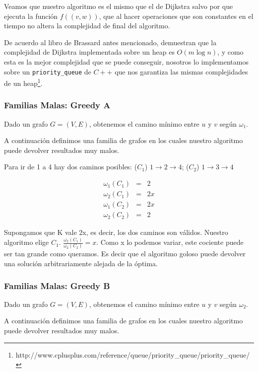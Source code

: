 Veamos que nuestro algoritmo es el mismo que el de Dijkstra salvo por que ejecuta la funci\'on $f((v,w))$, que al hacer operaciones que son constantes en el tiempo no altera la complejidad de final del algoritmo. 

De acuerdo al libro de Brassard antes mencionado, demuestran que la complejidad de Dijkstra implementada sobre un heap es $O(m \log n)$, y como esta es la mejor complejidad que se puede conseguir, nosotros lo implementamos sobre un \texttt{priority\_queue} de $C++$ que nos garantiza las mismas complejidades de un heap\footnote{http://www.cplusplus.com/reference/queue/priority\_queue/priority\_queue/}. 

\clearpage
\subsubsection{Familias Malas: Greedy A}\label{subsubsec:greedy-a}
Dado un grafo $G = (V,E)$, obtenemos el camino m\'inimo entre $u$ y $v$ seg\'un $\omega_1$. 

A continuación definimos una familia de grafos en los cuales nuestro algoritmo puede devolver resultados muy malos.

Para ir de 1 a 4 hay dos caminos posibles: ($C_1$) $1 \rightarrow 2 \rightarrow 4$; ($C_2$) $1 \rightarrow 3 \rightarrow 4$

\begin{eqnarray}
 \omega_1(C_1) &=& 2 	\\ 
 \omega_2(C_1) &=& 2x	\\
 \omega_1(C_2) &=& 2x	\\
 \omega_2(C_2) &=& 2
\end{eqnarray}

Supongamos que K vale 2x, es decir, los dos caminos son válidos. Nuestro algoritmo elige $C_1$.
$\frac{\omega_2(C_1)}{\omega_2(C_2)} = x$.
Como x lo podemos variar, este cociente puede ser tan grande como queramos. Es decir que el algoritmo goloso puede devolver una solución
arbitrariamente alejada de la óptima.

\clearpage
\subsubsection{Familias Malas: Greedy B}\label{subsubsec:greedy-b}
Dado un grafo $G = (V,E)$, obtenemos el camino m\'inimo entre $u$ y $v$ seg\'un $\omega_2$. 

A continuación definimos una familia de grafos en los cuales nuestro algoritmo puede devolver resultados muy malos.

